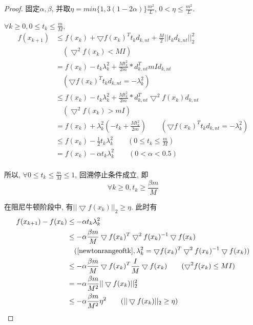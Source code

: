 \documentclass[UTF8]{ctexart}
\theoremstyle{Defination}
\theoremstyle{remark}
\begin{document}
\begin{proof}

固定$\alpha, \beta$, 并取$\eta=min\{1, 3(1-2\alpha)\}\frac{m^2}{L}$, $0<\eta\leq\frac{m^2}{L}$.

$\forall k\geq0, 0\leq t_k\leq\frac{m}{M}$, 
\begin{equation}
\label{newtonsteprange}
\begin{aligned}
f(x_{k+1}) & \leq f(x_k)+\bigtriangledown f(x_k)^Tt_kd_{k,nt}+\frac{M}{2}||t_kd_{k,nt}||_2^2 \\
 & \quad(\bigtriangledown^2f(x_k)<MI) \\
 & = f(x_k)-t_k\lambda_k^2+\frac{Mt_k^2}{2m}*d_{k,nt}^TmId_{k,nt} \\
 & \quad(\bigtriangledown f(x_k)^Tt_kd_{k,nt}=-\lambda_k^2) \\
 & \leq f(x_k)-t_k\lambda_k^2+\frac{Mt_k^2}{2m}*d_{k,nt}^T\bigtriangledown^2f(x_k)d_{k,nt} \\
 & \quad(\bigtriangledown^2f(x_k)>mI) \\
 & =f(x_k)+\lambda_k^2(-t_k+\frac{Mt_k^2}{2m})\qquad(\bigtriangledown f(x_k)^Tt_kd_{k,nt}=-\lambda_k^2) \\
 & \leq f(x_k)-\frac{1}{2}t_k\lambda_k^2\qquad(0\leq t_k\leq\frac{m}{M}) \\
 & =f(x_k)-\alpha t_k\lambda_k^2\qquad(0<\alpha<0.5) \\
\end{aligned}
\end{equation}

所以, $\forall0\leq t_k\leq\frac{m}{M}\leq1$, 回溯停止条件成立, 即
\begin{equation}
\label{newtonrangeoftk}
\forall k\geq0, t_k\geq\frac{\beta m}{M}
\end{equation}


在阻尼牛顿阶段中, 有$||\bigtriangledown f(x_k)||_2\geq\eta$. 此时有
\begin{equation}
\label{newtoniter}
\begin{aligned}
f(x_{k+1})-f(x_k) & \leq-\alpha t_k\lambda_k^2 \\
 & \leq-\alpha\frac{\beta m}{M}\bigtriangledown f(x_k)^T\bigtriangledown^2f(x_k)^{-1}\bigtriangledown f(x_k) \\
 & \quad(\autoref{newtonrangeoftk}, \lambda_k^2=\bigtriangledown f(x_k)^T\bigtriangledown^2f(x_k)^{-1}\bigtriangledown f(x_k)) \\
 & \leq -\alpha\frac{\beta m}{M}\bigtriangledown f(x_k)^T\frac{I}{M}\bigtriangledown f(x_k)\qquad(\bigtriangledown^2f(x_k)\leq MI) \\
 & =-\alpha\frac{\beta m}{M^2}||\bigtriangledown f(x_k)||_2^2 \\
 & \leq-\alpha\frac{\beta m}{M^2}\eta^2\qquad(||\bigtriangledown f(x_k)||_2\geq\eta)
\end{aligned}
\end{equation}


\end{proof}
\end{document}
